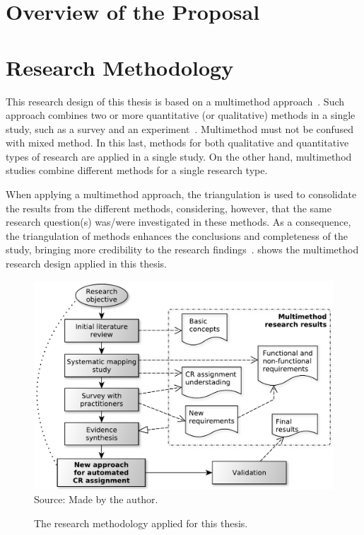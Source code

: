 {\section{Overview of the Proposal}
\lipsum[1-5]

\section{Research Methodology}

This research design of this thesis is based on a multimethod
approach~. Such approach combines two or more
quantitative (or qualitative) methods in a single study, such as a survey and an
experiment~. Multimethod must not be confused with mixed
method. In this last, methods for both qualitative and quantitative types of
research are applied in a single study. On the other hand, multimethod studies
combine different methods for a single research type.

When applying a multimethod approach, the triangulation is used to consolidate
the results from the different methods, considering, however, that the same
research question(s) was/were investigated in these methods. As a consequence,
the triangulation of methods enhances the conclusions and completeness of the
study, bringing more credibility to the research
findings~.  shows
the multimethod research design applied in this thesis.

\begin{figure}[h]
\centering
  \caption[Research methodology.]{The research methodology applied for this
  thesis.}
  \includegraphics[width=\columnwidth]{images/research-methodology-thesis.pdf}
  \footnotesize{Source: Made by the author.}
  \label{fig:research-methodology-thesis}
\end{figure}

}
